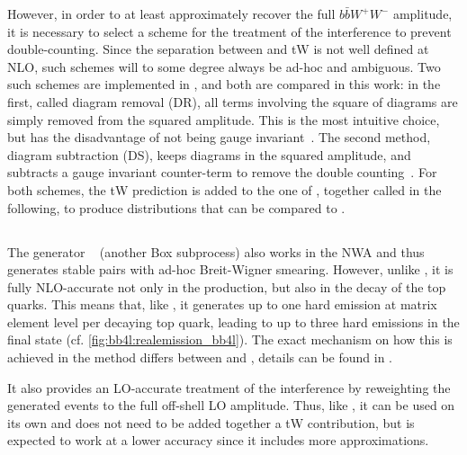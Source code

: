 
However, in order to at least approximately recover the full $b \bar{b} W^+ W^-$ amplitude, it is necessary to select a scheme for the treatment of the \tttW interference to prevent double-counting. Since the separation between \ttbar and tW is not well defined at NLO, such schemes will to some degree always be ad-hoc and ambiguous. Two such schemes are implemented in \ST, and both are compared in this work: in the first, called diagram removal (DR), all terms involving the square of \ttbar diagrams are simply removed from the squared amplitude. This is the most intuitive choice, but has the disadvantage of not being gauge invariant~\cite{Frixione:2008yi}. The second method, diagram subtraction (DS), keeps \ttbar diagrams in the squared amplitude, and subtracts a gauge invariant counter-term to remove the double counting~\cite{Tait:1999cf,Frixione:2008yi,Re:2010bp}. For both schemes, the tW prediction is added to the one of \hvq, together called \tttWsum in the following, to produce distributions that can be compared to \bbfourl.

\subsection{\texorpdfstring{\ttb}{ttb\_NLO\_dec}}
\label{sec:bb4l:ttb}

The generator \ttb~\cite{Campbell:2014kua} (another \powheg Box subprocess) also works in the NWA and thus generates stable \ttbar pairs with ad-hoc Breit-Wigner smearing. However, unlike \hvq, it is fully NLO-accurate not only in the production, but also in the decay of the top quarks. This means that, like \bbfourl, it generates up to one hard emission at matrix element level per decaying top quark, leading to up to three hard emissions in the final state (cf. \cref{fig:bb4l:realemission_bb4l}). The exact mechanism on how this is achieved in the \powheg method differs between \ttb and \bbfourl, details can be found in .

It also provides an LO-accurate treatment of the \tttW interference by reweighting the generated \ttbar events to the full off-shell LO amplitude. Thus, like \bbfourl, it can be used on its own and does not need to be added together a tW contribution, but is expected to work at a lower accuracy since it includes more approximations.

